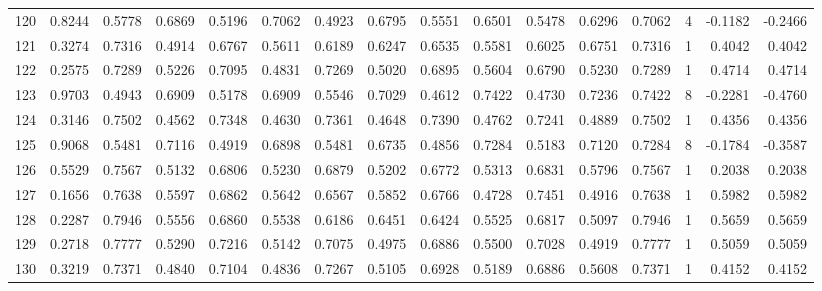 \begin{tabular}{lrrrrrrrrrrrrrrr}
120 &      0.8244 &  0.5778 &  0.6869 &  0.5196 &  0.7062 &  0.4923 &  0.6795 &  0.5551 &  0.6501 &  0.5478 &   0.6296 &     0.7062 &      4 &                   -0.1182 &                    -0.2466 \\
121 &      0.3274 &  0.7316 &  0.4914 &  0.6767 &  0.5611 &  0.6189 &  0.6247 &  0.6535 &  0.5581 &  0.6025 &   0.6751 &     0.7316 &      1 &                    0.4042 &                     0.4042 \\
122 &      0.2575 &  0.7289 &  0.5226 &  0.7095 &  0.4831 &  0.7269 &  0.5020 &  0.6895 &  0.5604 &  0.6790 &   0.5230 &     0.7289 &      1 &                    0.4714 &                     0.4714 \\
123 &      0.9703 &  0.4943 &  0.6909 &  0.5178 &  0.6909 &  0.5546 &  0.7029 &  0.4612 &  0.7422 &  0.4730 &   0.7236 &     0.7422 &      8 &                   -0.2281 &                    -0.4760 \\
124 &      0.3146 &  0.7502 &  0.4562 &  0.7348 &  0.4630 &  0.7361 &  0.4648 &  0.7390 &  0.4762 &  0.7241 &   0.4889 &     0.7502 &      1 &                    0.4356 &                     0.4356 \\
125 &      0.9068 &  0.5481 &  0.7116 &  0.4919 &  0.6898 &  0.5481 &  0.6735 &  0.4856 &  0.7284 &  0.5183 &   0.7120 &     0.7284 &      8 &                   -0.1784 &                    -0.3587 \\
126 &      0.5529 &  0.7567 &  0.5132 &  0.6806 &  0.5230 &  0.6879 &  0.5202 &  0.6772 &  0.5313 &  0.6831 &   0.5796 &     0.7567 &      1 &                    0.2038 &                     0.2038 \\
127 &      0.1656 &  0.7638 &  0.5597 &  0.6862 &  0.5642 &  0.6567 &  0.5852 &  0.6766 &  0.4728 &  0.7451 &   0.4916 &     0.7638 &      1 &                    0.5982 &                     0.5982 \\
128 &      0.2287 &  0.7946 &  0.5556 &  0.6860 &  0.5538 &  0.6186 &  0.6451 &  0.6424 &  0.5525 &  0.6817 &   0.5097 &     0.7946 &      1 &                    0.5659 &                     0.5659 \\
129 &      0.2718 &  0.7777 &  0.5290 &  0.7216 &  0.5142 &  0.7075 &  0.4975 &  0.6886 &  0.5500 &  0.7028 &   0.4919 &     0.7777 &      1 &                    0.5059 &                     0.5059 \\
130 &      0.3219 &  0.7371 &  0.4840 &  0.7104 &  0.4836 &  0.7267 &  0.5105 &  0.6928 &  0.5189 &  0.6886 &   0.5608 &     0.7371 &      1 &                    0.4152 &                     0.4152 \\

\end{tabular}
